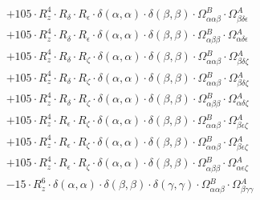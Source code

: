 \documentclass{article}
\begin{document}
\begin{subequations}
\begin{gather}
\begin{array}{c}
 \\[0.2em] 		 + 105 \cdot R_{z}^{4} \cdot R_{\delta{}} \cdot R_{\epsilon{}} \cdot \delta{}\left(\alpha{}, \alpha{}\right) \cdot \delta{}\left(\beta{}, \beta{}\right) \cdot \Omega{}^{B}_{\alpha{}\alpha{}\beta{}} \cdot \Omega{}^{A}_{\beta{}\delta{}\epsilon{}} 
 \\[0.2em] 		 + 105 \cdot R_{z}^{4} \cdot R_{\delta{}} \cdot R_{\epsilon{}} \cdot \delta{}\left(\alpha{}, \alpha{}\right) \cdot \delta{}\left(\beta{}, \beta{}\right) \cdot \Omega{}^{B}_{\alpha{}\beta{}\beta{}} \cdot \Omega{}^{A}_{\alpha{}\delta{}\epsilon{}} 
 \\[0.2em] 		 + 105 \cdot R_{z}^{4} \cdot R_{\delta{}} \cdot R_{\zeta{}} \cdot \delta{}\left(\alpha{}, \alpha{}\right) \cdot \delta{}\left(\beta{}, \beta{}\right) \cdot \Omega{}^{B}_{\alpha{}\alpha{}\beta{}} \cdot \Omega{}^{A}_{\beta{}\delta{}\zeta{}} 
 \\[0.2em] 		 + 105 \cdot R_{z}^{4} \cdot R_{\delta{}} \cdot R_{\zeta{}} \cdot \delta{}\left(\alpha{}, \alpha{}\right) \cdot \delta{}\left(\beta{}, \beta{}\right) \cdot \Omega{}^{B}_{\alpha{}\alpha{}\beta{}} \cdot \Omega{}^{A}_{\beta{}\delta{}\zeta{}} 
 \\[0.2em] 		 + 105 \cdot R_{z}^{4} \cdot R_{\delta{}} \cdot R_{\zeta{}} \cdot \delta{}\left(\alpha{}, \alpha{}\right) \cdot \delta{}\left(\beta{}, \beta{}\right) \cdot \Omega{}^{B}_{\alpha{}\beta{}\beta{}} \cdot \Omega{}^{A}_{\alpha{}\delta{}\zeta{}} 
 \\[0.2em] 		 + 105 \cdot R_{z}^{4} \cdot R_{\epsilon{}} \cdot R_{\zeta{}} \cdot \delta{}\left(\alpha{}, \alpha{}\right) \cdot \delta{}\left(\beta{}, \beta{}\right) \cdot \Omega{}^{B}_{\alpha{}\alpha{}\beta{}} \cdot \Omega{}^{A}_{\beta{}\epsilon{}\zeta{}} 
 \\[0.2em] 		 + 105 \cdot R_{z}^{4} \cdot R_{\epsilon{}} \cdot R_{\zeta{}} \cdot \delta{}\left(\alpha{}, \alpha{}\right) \cdot \delta{}\left(\beta{}, \beta{}\right) \cdot \Omega{}^{B}_{\alpha{}\alpha{}\beta{}} \cdot \Omega{}^{A}_{\beta{}\epsilon{}\zeta{}} 
 \\[0.2em] 		 + 105 \cdot R_{z}^{4} \cdot R_{\epsilon{}} \cdot R_{\zeta{}} \cdot \delta{}\left(\alpha{}, \alpha{}\right) \cdot \delta{}\left(\beta{}, \beta{}\right) \cdot \Omega{}^{B}_{\alpha{}\beta{}\beta{}} \cdot \Omega{}^{A}_{\alpha{}\epsilon{}\zeta{}} 
 \\[0.2em] 		 - 15 \cdot R_{z}^{6} \cdot \delta{}\left(\alpha{}, \alpha{}\right) \cdot \delta{}\left(\beta{}, \beta{}\right) \cdot \delta{}\left(\gamma{}, \gamma{}\right) \cdot \Omega{}^{B}_{\alpha{}\alpha{}\beta{}} \cdot \Omega{}^{A}_{\beta{}\gamma{}\gamma{}} 

\end{array}
\end{gather}
\end{subequations}
\end{document}

